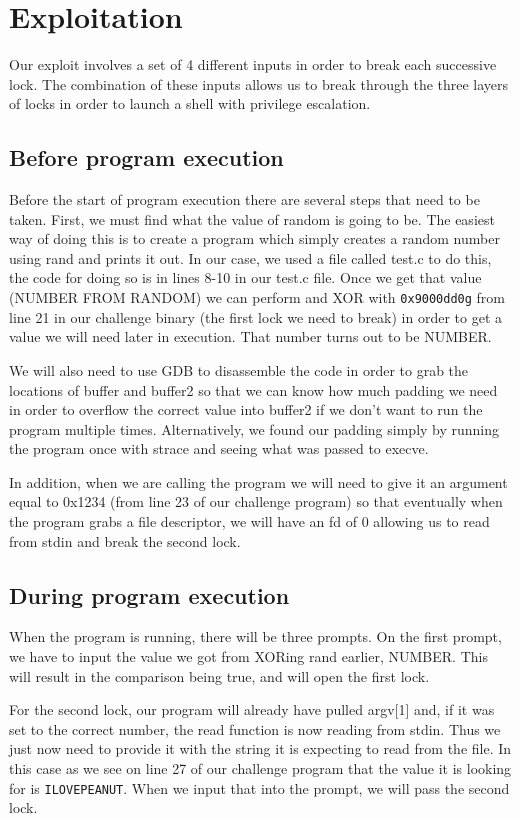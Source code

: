 \section{Exploitation}
Our exploit involves a set of 4 different inputs in order to break each successive lock. The combination of these inputs allows us to break through the three layers of locks in order to launch a shell with privilege escalation. 

\subsection{Before program execution}
Before the start of program execution there are several steps that need to be taken. First, we must find what the value of random is going to be. The easiest way of doing this is to create a program which simply creates a random number using rand and prints it out. In our case, we used a file called test.c to do this, the code for doing so is in lines 8-10 in our test.c file. Once we get that value (NUMBER FROM RANDOM) we can perform and XOR with {\tt 0x9000dd0g} from line 21 in our challenge binary (the first lock we need to break) in order to get a value we will need later in execution. That number turns out to be NUMBER.

We will also need to use GDB to disassemble the code in order to grab the locations of buffer and buffer2 so that we can know how much padding we need in order to overflow the correct value into buffer2 if we don't want to run the program multiple times. Alternatively, we found our padding simply by running the program once with strace and seeing what was passed to execve. 

In addition, when we are calling the program we will need to give it an argument equal to 0x1234 (from line 23 of our challenge program) so that eventually when the program grabs a file descriptor, we will have an fd of 0 allowing us to read from stdin and break the second lock.

\subsection{During program execution} 
When the program is running, there will be three prompts. On the first prompt, we have to input the value we got from XORing rand earlier, NUMBER. This will result in the comparison being true, and will open the first lock. 

For the second lock, our program will already have pulled argv[1] and, if it was set to the correct number, the read function is now reading from stdin. Thus we just now need to provide it with the string it is expecting to read from the file. In this case as we see on line 27 of our challenge program that the value it is looking for is {\tt ILOVEPEANUT}. When we input that into the prompt, we will pass the second lock.


